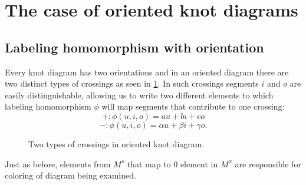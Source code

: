 \section{The case of oriented knot diagrams}

\subsection{Labeling homomorphism with orientation}

Every knot diagram has two orientations and in an oriented diagram there are two distinct types of crossings as seen in \cref{fig:3:two:types:crossings}. In such crossings segments $i$ and $o$ are easily distinguishable, allowing us to write two different elements to which labeling homomorphism $\phi$ will map segments that contribute to one crossing:
$$+:\phi(u,i,o)=au+bi+co$$
$$-:\phi(u,i,o)=\alpha u+\beta i+\gamma o.$$

\begin{figure}[h]\centering
  \caption{\label{fig:3:two:types:crossings}Two types of crossings in oriented knot diagram.}
\end{figure}

Just as before, elements from $M^s$ that map to $0$ element in $M^x$ are responsible for coloring of diagram being examined. 
